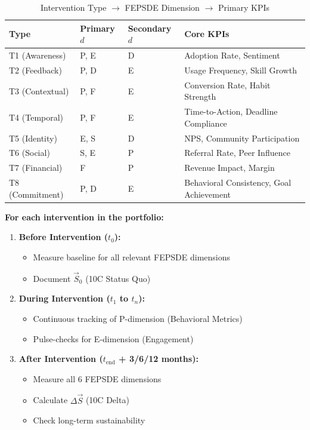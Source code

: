 \begin{table}[htbp]
\centering
\caption{Intervention Type $\rightarrow$ FEPSDE Dimension $\rightarrow$ Primary KPIs}
\label{tab:hhh-type-kpi-mapping}
\renewcommand{\arraystretch}{1.3}
\footnotesize
\begin{tabular}{@{}llll@{}}
\toprule
\textbf{Type} & \textbf{Primary $d$} & \textbf{Secondary $d$} & \textbf{Core KPIs} \\
\midrule
T1 (Awareness) & P, E & D & Adoption Rate, Sentiment \\
T2 (Feedback) & P, D & E & Usage Frequency, Skill Growth \\
T3 (Contextual) & P, F & E & Conversion Rate, Habit Strength \\
T4 (Temporal) & P, F & E & Time-to-Action, Deadline Compliance \\
T5 (Identity) & E, S & D & NPS, Community Participation \\
T6 (Social) & S, E & P & Referral Rate, Peer Influence \\
T7 (Financial) & F & P & Revenue Impact, Margin \\
T8 (Commitment) & P, D & E & Behavioral Consistency, Goal Achievement \\
\bottomrule
\end{tabular}
\end{table}

\begin{tcolorbox}[colback=blue!5!white, colframe=blue!75!black,
    title=\textbf{The 3$\times$3 KPI Protocol}]

\textbf{For each intervention in the portfolio:}

\begin{enumerate}
\item \textbf{Before Intervention ($t_0$):}
   \begin{itemize}[nosep]
   \item Measure baseline for all relevant FEPSDE dimensions
   \item Document $\vec{S}_0$ (10C Status Quo)
   \end{itemize}

\item \textbf{During Intervention ($t_1$ to $t_n$):}
   \begin{itemize}[nosep]
   \item Continuous tracking of P-dimension (Behavioral Metrics)
   \item Pulse-checks for E-dimension (Engagement)
   \end{itemize}

\item \textbf{After Intervention ($t_{\text{end}}$ + 3/6/12 months):}
   \begin{itemize}[nosep]
   \item Measure all 6 FEPSDE dimensions
   \item Calculate $\Delta\vec{S}$ (10C Delta)
   \item Check long-term sustainability
   \end{itemize}
\end{enumerate}

\end{tcolorbox}


